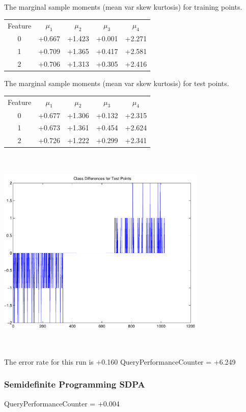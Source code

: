 \documentclass[9pt]{article}
\theoremstyle{plain}
\theoremstyle{definition}
\theoremstyle{remark}
\numberwithin{equation}{section}
\begin{document}
The marginal sample moments (mean var skew kurtosis) for training points.\newline
\begin{tabular}{ c |  c  c  c  c}
Feature & $\mu_1$ & $\mu_2$ & $\mu_3$ & $\mu_4$ \\
0 & +0.667 & +1.423 & +0.001& +2.271 \\
\hline
1 & +0.709 & +1.365 & +0.417& +2.581 \\
\hline
2 & +0.706 & +1.313 & +0.305& +2.416 \\
\hline
\end{tabular}
\newline
The marginal sample moments (mean var skew kurtosis) for test points.\newline
\begin{tabular}{ c | c  c  c  c}
Feature & $\mu_1$ & $\mu_2$ & $\mu_3$ & $\mu_4$ \\
0 & +0.677 & +1.306 & +0.132& +2.315\\
\hline
1 & +0.673 & +1.361 & +0.454& +2.624\\
\hline
2 & +0.726 & +1.222 & +0.299& +2.341\\
\hline
\end{tabular}\newline
\includegraphics[width=10.0cm,height=10.0cm]{classDiffs.pdf}

The error rate for this run is +0.160\newline
QueryPerformanceCounter  =  +6.249
\subsubsection{Semidefinite Programming SDPA}
QueryPerformanceCounter  =  +0.004
\end{document}
